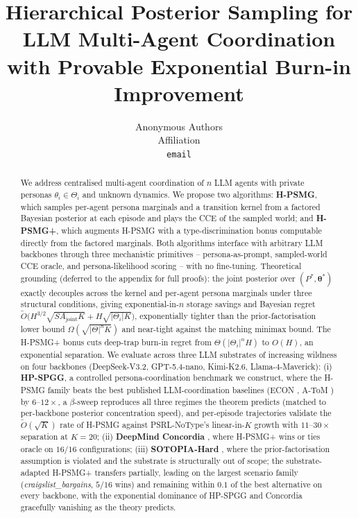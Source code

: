 ﻿\documentclass{article}
\title{Hierarchical Posterior Sampling for LLM Multi-Agent Coordination\\
with Provable Exponential Burn-in Improvement}
\author{Anonymous Authors\\
Affiliation\\
\texttt{email}}
\def\textsuperscript#1{#1}%
\begin{document}
\maketitle

\begin{abstract}
We address centralised multi-agent coordination of $n$ LLM agents with private personas $\theta_i\!\in\!\Theta_i$ and unknown dynamics. We propose two algorithms: \textbf{H-PSMG}, which samples per-agent persona marginals and a transition kernel from a factored Bayesian posterior at each episode and plays the CCE of the sampled world; and \textbf{H-PSMG\textsuperscript{+}}, which augments H-PSMG with a type-discrimination bonus computable directly from the factored marginals. Both algorithms interface with arbitrary LLM backbones through three mechanistic primitives -- persona-as-prompt, sampled-world CCE oracle, and persona-likelihood scoring -- with no fine-tuning. Theoretical grounding (deferred to the appendix for full proofs): the joint posterior over $(P^*, \boldsymbol\theta^*)$ exactly decouples across the kernel and per-agent persona marginals under three structural conditions, giving exponential-in-$n$ storage savings and Bayesian regret $\tilde O\!\big(H^{3/2}\!\sqrt{SA_{\mathrm{joint}}K} + H\sqrt{|\Theta_i|K}\big)$, exponentially tighter than the prior-factorisation lower bound $\Omega(\sqrt{|\Theta|^n K})$ and near-tight against the matching minimax bound. The H-PSMG\textsuperscript{+} bonus cuts deep-trap burn-in regret from $\Theta(|\Theta_i|^n H)$ to $O(H)$, an exponential separation. We evaluate across three LLM substrates of increasing wildness on four backbones (DeepSeek-V3.2, GPT-5.4-nano, Kimi-K2.6, Llama-4-Maverick): (i) \textbf{HP-SPGG}, a controlled persona-coordination benchmark we construct, where the H-PSMG family beats the best published LLM-coordination baselines (ECON \citep{yang2025econ}, A-ToM \citep{xu2026atom}) by $6$--$12\times$, a $\beta$-sweep reproduces all three regimes the theorem predicts (matched to per-backbone posterior concentration speed), and per-episode trajectories validate the $\tilde O(\sqrt K)$ rate of H-PSMG against PSRL-NoType's linear-in-$K$ growth with $11$--$30\times$ separation at $K{=}20$; (ii) \textbf{DeepMind Concordia} \citep{vezhnevets2023concordia}, where H-PSMG\textsuperscript{+} wins or ties oracle on $16/16$ configurations; (iii) \textbf{SOTOPIA-Hard} \citep{zhou2024sotopia}, where the prior-factorisation assumption is violated and the substrate is structurally out of scope; the substrate-adapted H-PSMG\textsuperscript{+} transfers partially, leading on the largest scenario family (\emph{craigslist\_bargains}, $5/16$ wins) and remaining within $0.1$ of the best alternative on every backbone, with the exponential dominance of HP-SPGG and Concordia gracefully vanishing as the theory predicts.
\end{abstract}
\end{document}
